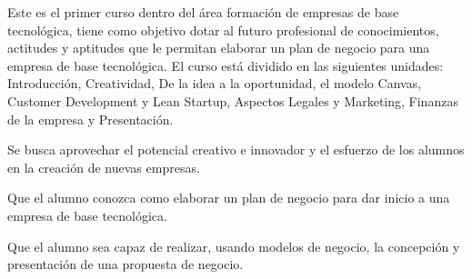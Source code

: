 \begin{syllabus}


\begin{justification}
Este es el primer curso dentro del área formación de empresas de
base tecnológica, tiene como objetivo dotar al futuro profesional 
de conocimientos, actitudes y aptitudes que le
permitan elaborar un plan de negocio para una empresa de base tecnológica.
El curso está dividido en las siguientes unidades:
Introducción, Creatividad, De la idea a la oportunidad, el modelo Canvas, Customer Development y Lean Startup, Aspectos Legales y Marketing, Finanzas de la empresa y Presentación.

Se busca aprovechar el potencial creativo e innovador y el esfuerzo de los alumnos en la creación de nuevas empresas.
\end{justification}

\begin{goals}
\item Que el alumno conozca como elaborar un plan de negocio para dar inicio a una empresa de base tecnológica.
\item Que el alumno sea capaz de realizar, usando modelos de negocio, la concepción y presentación de una propuesta de negocio.
\end{goals}

\begin{outcomes}
    \item {}
    \item {}
    \item {}
    \item {}
    \item {}
\end{outcomes}

\begin{competences}
    \item {} %
    \item {} %
    \item {}
    \item {}
    \item {}
    \item {}
    \item {}
    \item {}
    

\end{competences}
\end{syllabus}
